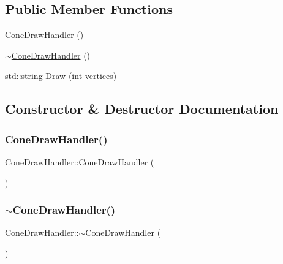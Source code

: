 \subsection*{Public Member Functions}
\begin{DoxyCompactItemize}
\item 
\mbox{\hyperlink{class_cone_draw_handler_afa99f8e927b1c924ae83dbebd70469a6}{Cone\+Draw\+Handler}} ()
\item 
\mbox{\hyperlink{class_cone_draw_handler_aad5e65404d7a542053065654c55620e5}{$\sim$\+Cone\+Draw\+Handler}} ()
\item 
std\+::string \mbox{\hyperlink{class_cone_draw_handler_a6cd768c6036dd1ba79f577f9907fd819}{Draw}} (int vertices)
\end{DoxyCompactItemize}


\subsection{Constructor \& Destructor Documentation}
\mbox{\label{class_cone_draw_handler_afa99f8e927b1c924ae83dbebd70469a6}} 
\subsubsection{\texorpdfstring{ConeDrawHandler()}{ConeDrawHandler()}}
{\footnotesize\ttfamily Cone\+Draw\+Handler\+::\+Cone\+Draw\+Handler (\begin{DoxyParamCaption}{ }\end{DoxyParamCaption})}

\mbox{\label{class_cone_draw_handler_aad5e65404d7a542053065654c55620e5}} 
\subsubsection{\texorpdfstring{$\sim$ConeDrawHandler()}{~ConeDrawHandler()}}
{\footnotesize\ttfamily Cone\+Draw\+Handler\+::$\sim$\+Cone\+Draw\+Handler (\begin{DoxyParamCaption}{ }\end{DoxyParamCaption})}



